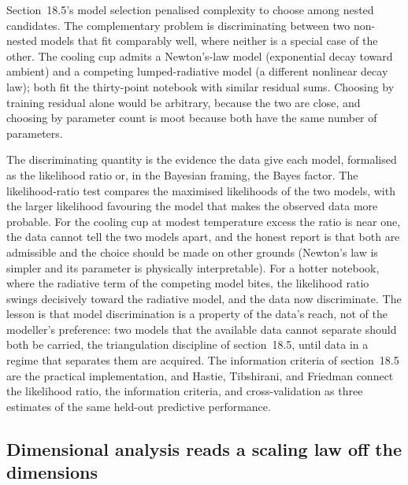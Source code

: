 Section~18.5's model selection penalised complexity to choose among nested
candidates. The complementary problem is discriminating between two
non-nested models that fit comparably well, where neither is a special case
of the other. The cooling cup admits a Newton's-law model (exponential
decay toward ambient) and a competing lumped-radiative model (a different
nonlinear decay law); both fit the thirty-point notebook with similar
residual sums. Choosing by training residual alone would be arbitrary,
because the two are close, and choosing by parameter count is moot because
both have the same number of parameters.

The discriminating quantity is the evidence the data give each model,
formalised as the likelihood ratio or, in the Bayesian framing, the Bayes
factor. The likelihood-ratio test compares the maximised likelihoods of the
two models, with the larger likelihood favouring the model that makes the
observed data more probable. For the cooling cup at modest temperature
excess the ratio is near one, the data cannot tell the two models apart,
and the honest report is that both are admissible and the choice should be
made on other grounds (Newton's law is simpler and its parameter is
physically interpretable). For a hotter notebook, where the radiative term
of the competing model bites, the likelihood ratio swings decisively toward
the radiative model, and the data now discriminate. The lesson is that
model discrimination is a property of the data's reach, not of the
modeller's preference: two models that the available data cannot separate
should both be carried, the triangulation discipline of section~18.5, until
data in a regime that separates them are acquired. The information criteria
of section~18.5 are the practical implementation, and Hastie, Tibshirani,
and Friedman \cite{text:v2ch18-hastie-statistical-learning-2009} connect
the likelihood ratio, the information criteria, and cross-validation as
three estimates of the same held-out predictive performance.

\subsection{Dimensional analysis reads a scaling law off the dimensions}

